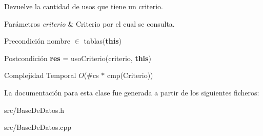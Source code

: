 Devuelve la cantidad de usos que tiene un criterio. 


\begin{DoxyParams}{Parámetros}
{\em criterio} & Criterio por el cual se consulta.\\
\hline
\end{DoxyParams}
\begin{DoxyPrecond}{Precondición}
nombre $\in$ tablas({\bfseries this}) 
\end{DoxyPrecond}
\begin{DoxyPostcond}{Postcondición}
{\bfseries res} = uso\-Criterio(criterio, {\bfseries this})
\end{DoxyPostcond}

\begin{DoxyDescription}
\item[Complejidad Temporal]$O$(\#cs $\ast$ cmp(\-Criterio))
\end{DoxyDescription}

La documentación para esta clase fue generada a partir de los siguientes ficheros\-:\begin{DoxyCompactItemize}
\item 
src/Base\-De\-Datos.\-h\item 
src/Base\-De\-Datos.\-cpp\end{DoxyCompactItemize}
